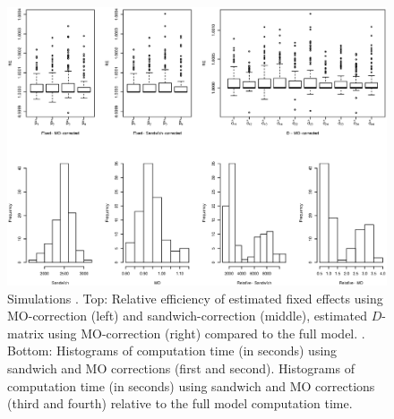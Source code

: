 \documentclass[11pt,a5paper,twoside]{book}
\begin{document}


\begin{figure}[htb]
\begin{center}
\includegraphics[width=\textwidth]{fig_sim_eq_new.eps}
\caption[Simulations (Gaussian outcomes) comparing sandwich and MO corrections separately]{Simulations {\color{black}{(Gaussian outcomes)}}. Top: Relative efficiency of estimated fixed effects using MO-correction (left) and sandwich-correction (middle), estimated $D$-matrix using MO-correction (right) compared to the full model. {}. Bottom: Histograms of computation time (in seconds) using sandwich and MO corrections (first and second). Histograms of computation time (in seconds) using sandwich and MO corrections (third and fourth) relative to the full model computation time.}
\label{fig_sim}
\end{center}
\end{figure}
\end{document}
